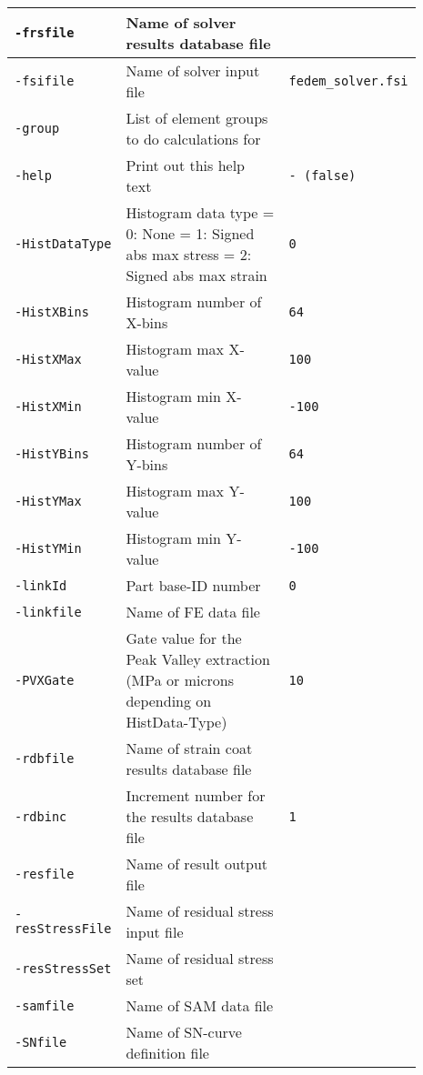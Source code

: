 {\begin{tabular}{|>{\raggedright} p{0.23\linewidth}| p{0.48\linewidth}| p{0.18\linewidth}|}
  \hline
  \texttt{-frsfile} &   Name of solver results database file  &  \\
  \hline
  \texttt{-fsifile} &   Name of solver input file  & \scriptsize{\texttt{fedem\_solver.fsi}}   \\
  \hline
  \texttt{-group} &   List of element groups to do calculations for  &  \\
  \hline
  \texttt{-help} &   Print out this help text  & \texttt{- (false)}   \\
  \hline
  \texttt{-HistDataType} &   Histogram data type\newline
                             = 0: None\newline
                             = 1: Signed abs max stress\newline
                             = 2: Signed abs max strain   & \texttt{0}   \\
  \hline
  \texttt{-HistXBins} &   Histogram number of X-bins  & \texttt{64}   \\
  \hline
  \texttt{-HistXMax} &   Histogram max X-value  & \texttt{100}   \\
  \hline
  \texttt{-HistXMin} &   Histogram min X-value  & \texttt{-100}   \\
  \hline
  \texttt{-HistYBins} &   Histogram number of Y-bins  & \texttt{64}   \\
  \hline
  \texttt{-HistYMax} &   Histogram max Y-value  & \texttt{100}   \\
  \hline
  \texttt{-HistYMin} &    Histogram min Y-value  & \texttt{-100}   \\
  \hline
  \texttt{-linkId} &    Part base-ID number  & \texttt{0}   \\
  \hline
  \texttt{-linkfile} &    Name of FE data file  &  \\
  \hline
  \texttt{-PVXGate} &    Gate value for the Peak Valley extraction (MPa or microns depending on HistData-Type)  & \texttt{10}   \\
  \hline
  \texttt{-rdbfile} &    Name of strain coat results database file  &  \\
  \hline
  \texttt{-rdbinc} &    Increment number for the results database file   & \texttt{1} \\
  \hline
  {\tt-resfile} & Name of result output file & \\
  \hline
  {\tt-resStressFile} & Name of residual stress input file & \\
  \hline
  {\tt-resStressSet} & Name of residual stress set & \\
  \hline
  {\tt-samfile} & Name of SAM data file & \\
  \hline
  {\tt-SNfile} & Name of SN-curve definition file & \\
  \hline
\end{tabular}}

